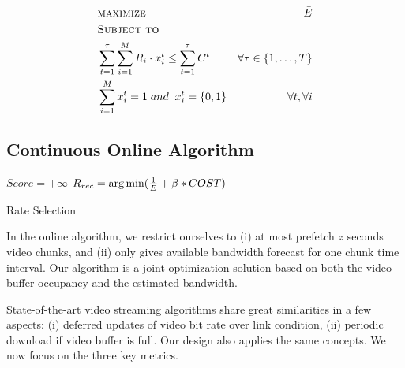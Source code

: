 \begin{subequations}
\begin{align*}
&\textsc{maximize }&\bar{E}\\ 
&\textsc{Subject to}\\
&\sum \limits_{t=1}^\tau  \sum \limits_{i=1}^M R_i \cdot x_i^t\leq\sum\limits_{t=1}^\tau C^t& \forall \tau \in \{1, \dots, T\}\\
&\sum \limits_{i=1}^M x_i^t =1\; and\;\; x_i^t = \{0,1\}&\forall t, \forall i
\end{align*}
\end{subequations}

\subsection{Continuous Online Algorithm} \label{subsec:online}
\begin{algorithm}[ht]
\SetAlgoLined
$Score = +\infty$\;
$ R_{rec}=\operatorname*{arg\,min} (\frac{1}{E} + \beta*COST )$\;

\caption{Rate Selection} \label{cap:algorithm}
\end{algorithm} 

In the online algorithm, we restrict ourselves to (i) at most prefetch $z$ seconds video chunks, and (ii) only gives available bandwidth forecast for one chunk time interval. Our algorithm is a joint optimization solution based on both the video buffer occupancy and the estimated bandwidth. 

State-of-the-art video streaming algorithms \cite{BBA, Festive} share great similarities in a few aspects: (i) deferred updates of video bit rate over link condition, (ii) periodic download if video buffer is full. Our design also applies the same concepts. We now focus on the three key metrics.

